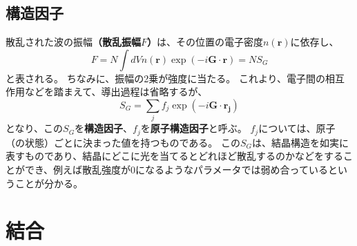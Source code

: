 \documentclass[a4paper]{jsreport}
\begin{document}
        \section{構造因子}
            散乱された波の振幅\textbf{（散乱振幅$F$）}は、その位置の電子密度$n(\boldsymbol{r})$に依存し、
            \begin{equation}
                F = N \int dV n(\boldsymbol{r}) \exp(-i\boldsymbol{G} \cdot \boldsymbol{r}) = NS_G
            \end{equation}
            と表される。
            ちなみに、振幅の2乗が強度に当たる。
            これより、電子間の相互作用などを踏まえて、導出過程は省略するが、
            \begin{equation}
                S_G = \sum_{j}f_j \exp(-i\boldsymbol{G} \cdot \boldsymbol{r_j})
            \end{equation}
            となり、この$S_G$を\textbf{構造因子}、$f_j$を\textbf{原子構造因子}と呼ぶ。
            $f_j$については、原子（の状態）ごとに決まった値を持つものである。
            この$S_G$は、結晶構造を如実に表すものであり、結晶にどこに光を当てるとどれほど散乱するのかなどをすることができ、例えば散乱強度が$0$になるようなパラメータでは弱め合っているということが分かる。

        
        

    \chapter{結合}
        \section{}
        \section{}
        \section{}
        \section{}
        \section{}
        \section{}
        
\end{document}
